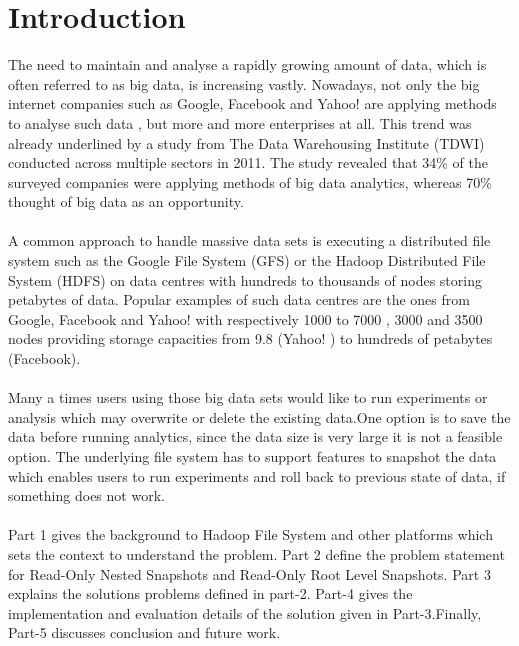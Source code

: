
%
%
%


\chapter{Introduction}
\label{ch:Introduction}

The need to maintain and analyse a rapidly growing amount of data, which is often referred to as big data, is increasing vastly. Nowadays, not only the big internet companies such as Google, Facebook and Yahoo! are applying methods to analyse such data , but more and more enterprises at all. This trend was already underlined by a study from The Data Warehousing Institute (TDWI)  conducted across multiple sectors in 2011. The study \cite{TWDI-Report} revealed that 34\% of the surveyed companies were applying methods of big data analytics, whereas 70\% thought of big data as an opportunity. \\\\
  A common approach to handle massive data sets is executing a distributed file system such as the Google File System (GFS)  or the Hadoop Distributed File System (HDFS)  on data centres with hundreds to thousands of nodes storing petabytes of data. Popular examples of such data centres are the ones from Google, Facebook and Yahoo! with respectively 1000 to 7000 , 3000  and 3500 nodes  providing storage capacities from 9.8 (Yahoo! ) to hundreds of petabytes (Facebook).\\\\
Many a times users using those big data sets would like to run experiments or analysis which may overwrite or delete the existing data.One option is to save the data before running analytics, since the data size is very large it is not a feasible option. The underlying file system has to support features to snapshot the data which enables users to run experiments and roll back to previous state of data, if something does not work.\\\\
Part 1 gives the background to Hadoop File System and other platforms which sets the context to understand the problem.
Part 2 define the problem statement for Read-Only Nested Snapshots and Read-Only Root Level Snapshots. Part 3 explains the solutions problems defined in part-2. Part-4 gives the implementation and evaluation details of the solution given in Part-3.Finally, Part-5 discusses conclusion and future work.


